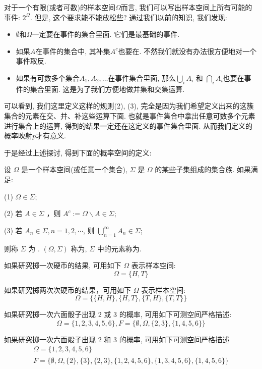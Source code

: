 \documentclass{ctexart}
\begin{document}
对于一个有限(或者可数)的样本空间$\Omega$而言, 我们可以写出样本空间上所有可能的事件: $2^\Omega$. 但是, 这个要求能不能放松些? 通过我们以前的知识, 我们发现: 
\begin{itemize}
    \item $\emptyset$和$\Omega$一定要在事件的集合里面. 它们是最基础的事件. 
    \item 如果$A$在事件的集合中, 其补集$A^c$也要在. 不然我们就没有办法很方便地对一个事件取反. 
    \item 如果有可数多个集合$A_1, A_2, \ldots$在事件集合里面, 那么$\bigcup_i A_i$ 和 $\bigcap_i A_i$也要在事件的集合里面. 这是为了我们方便地做并集和交集运算. 
\end{itemize} 

可以看到, 我们这里定义这样的规则(2), (3), 完全是因为我们希望定义出来的这簇集合的元素在交、并、补这些运算下面. 也就是事件集合中拿出任意可数多个元素进行集合上的运算, 得到的结果一定还在这定义的事件集合里面. 从而我们定义的概率映射$p$才有意义. 

于是经过上述探讨, 得到下面的概率空间的定义: 

\begin{definition}
    设 $\Omega$ 是一个样本空间(或任意一个集合), $\Sigma$ 是 $\Omega$ 的某些子集组成的集合族. 如果满足:

(1) $\Omega \in \Sigma$;

(2) 若 $A \in \Sigma$ ，则 $A^{c}:=\Omega \backslash A \in \Sigma$;

(3) 若 $A_{n} \in \Sigma, n=1,2, \cdots$, 则 $\bigcup_{n=1}^{\infty} A_{n} \in \Sigma$;

则称 $\Sigma$ 为 . $(\Omega, \Sigma)$ 称为, $\Sigma$ 中的元素称为.
\end{definition}

\begin{example}
    如果研究掷一次硬币的结果, 可用如下 $\Omega$ 表示样本空间:
$$
\Omega=\{H, T\}
$$

如果研究掷两次次硬币的结果，可用如下 $\Omega$ 表示样本空间:
$$
\Omega=\{\{H, H\},\{H, T\},\{T, H\},\{T, T\}\}
$$

如果研究掷一次六面骰子出现 2 或 3 的概率, 可用如下可测空间严格描述:
$$
\Omega=\{1,2,3,4,5,6\}, F=\{\emptyset, \Omega,\{2,3\},\{1,4,5,6\}\}
$$

如果研究掷一次六面骰子出现 2 和 3 的概率, 可用如下可测空间严格描述
$$
\begin{gathered}
\Omega=\{1,2,3,4,5,6\} \\
F=\{\emptyset, \Omega,\{2\},\{3\},\{2,3\},\{1,2,4,5,6\},\{1,3,4,5,6\},\{1,4,5,6\}\}
\end{gathered}
$$
\end{example}
\end{document}
